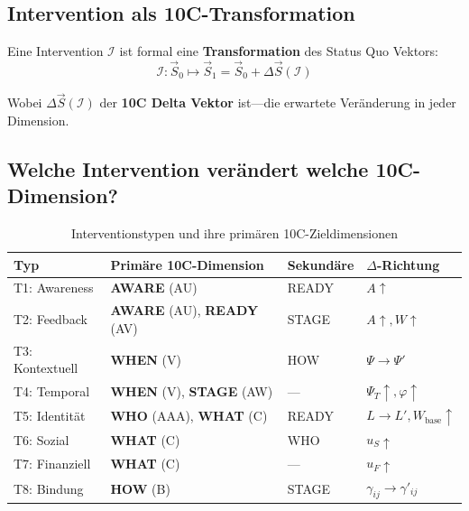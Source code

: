 \subsection{Intervention als 10C-Transformation}

Eine Intervention $\mathcal{I}$ ist formal eine \textbf{Transformation} des Status Quo Vektors:
\begin{equation}
\boxed{\mathcal{I}: \vec{S}_0 \mapsto \vec{S}_1 = \vec{S}_0 + \Delta\vec{S}(\mathcal{I})}
\label{eq:17-intervention-transform}
\end{equation}

Wobei $\Delta\vec{S}(\mathcal{I})$ der \textbf{10C Delta Vektor} ist---die erwartete Veränderung in jeder Dimension.

\subsection{Welche Intervention verändert welche 10C-Dimension?}

\begin{table}[htbp]
\centering
\caption{Interventionstypen und ihre primären 10C-Zieldimensionen}
\label{tab:17-type-to-9c}
\renewcommand{\arraystretch}{1.3}
\small
\begin{tabular}{@{}llll@{}}
\toprule
\textbf{Typ} & \textbf{Primäre 10C-Dimension} & \textbf{Sekundäre} & \textbf{$\Delta$-Richtung} \\
\midrule
T1: Awareness & \textbf{AWARE} (AU) & READY & $A \uparrow$ \\
T2: Feedback & \textbf{AWARE} (AU), \textbf{READY} (AV) & STAGE & $A \uparrow, W \uparrow$ \\
T3: Kontextuell & \textbf{WHEN} (V) & HOW & $\Psi \rightarrow \Psi'$ \\
T4: Temporal & \textbf{WHEN} (V), \textbf{STAGE} (AW) & --- & $\Psi_T \uparrow, \varphi \uparrow$ \\
T5: Identität & \textbf{WHO} (AAA), \textbf{WHAT} (C) & READY & $L \rightarrow L', W_{\text{base}} \uparrow$ \\
T6: Sozial & \textbf{WHAT} (C) & WHO & $u_S \uparrow$ \\
T7: Finanziell & \textbf{WHAT} (C) & --- & $u_F \uparrow$ \\
T8: Bindung & \textbf{HOW} (B) & STAGE & $\gamma_{ij} \rightarrow \gamma'_{ij}$ \\
\bottomrule
\end{tabular}
\end{table}

